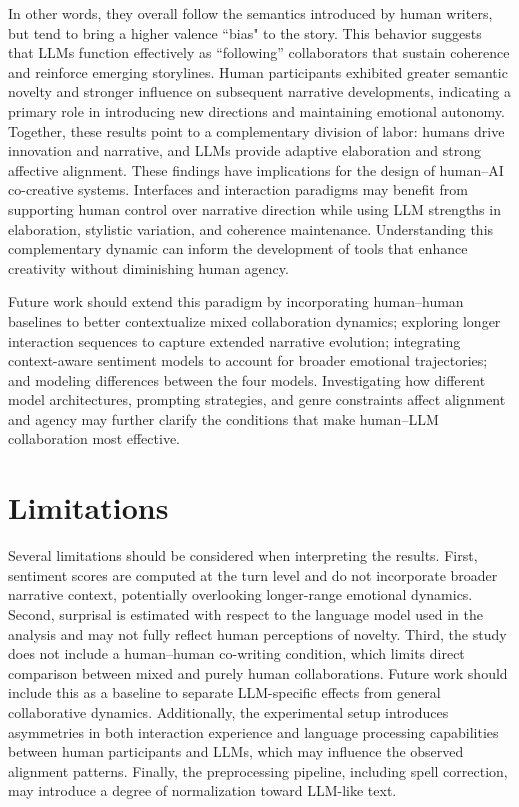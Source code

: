 \documentclass[11pt]{article}
\begin{document}
In other words, they overall follow the semantics introduced by human writers, but tend to bring a higher valence ``bias" to the story. This behavior suggests that LLMs function effectively as ``following'' collaborators that sustain coherence and reinforce emerging storylines.
Human participants exhibited greater semantic novelty and stronger influence on subsequent narrative developments, indicating a primary role in introducing new directions and maintaining emotional autonomy. Together, these results point to a complementary division of labor: humans drive innovation and narrative, and LLMs provide adaptive elaboration and strong affective alignment.
These findings have implications for the design of human–AI co-creative systems. Interfaces and interaction paradigms may benefit from supporting human control over narrative direction while using LLM strengths in elaboration, stylistic variation, and coherence maintenance. Understanding this complementary dynamic can inform the development of tools that enhance creativity without diminishing human agency.

Future work should extend this paradigm by incorporating human–human baselines to better contextualize mixed collaboration dynamics; exploring longer interaction sequences to capture extended narrative evolution; integrating context-aware sentiment models to account for broader emotional trajectories; and modeling differences between the four models. Investigating how different model architectures, prompting strategies, and genre constraints affect alignment and agency may further clarify the conditions that make human–LLM collaboration most effective.


\section*{Limitations}
Several limitations should be considered when interpreting the results. First, sentiment scores are computed at the turn level and do not incorporate broader narrative context, potentially overlooking longer-range emotional dynamics. Second, surprisal is estimated with respect to the language model used in the analysis and may not fully reflect human perceptions of novelty. Third, the study does not include a human–human co-writing condition, which limits direct comparison between mixed and purely human collaborations. Future work should include this as a baseline to separate LLM-specific effects from general collaborative dynamics.
Additionally, the experimental setup introduces asymmetries in both interaction experience and language processing capabilities between human participants and LLMs, which may influence the observed alignment patterns. Finally, the preprocessing pipeline, including spell correction, may introduce a degree of normalization toward LLM-like text.
\end{document}
